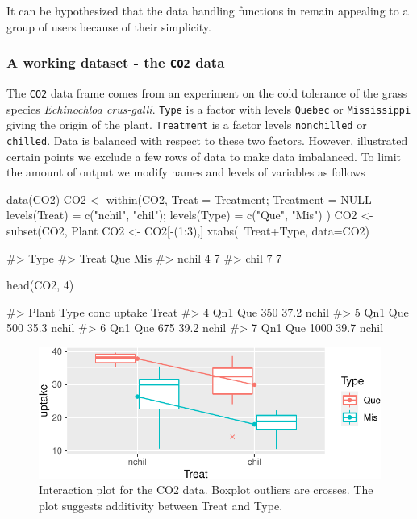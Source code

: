 It can be hypothesized that the data handling functions in 
remain appealing to a group of users because of their simplicity.

\hypertarget{a-working-dataset---the-co2-data}{%
\subsubsection{\texorpdfstring{A working dataset - the \texttt{CO2}
data}{A working dataset - the CO2 data}}\label{a-working-dataset---the-co2-data}}

The \texttt{CO2} data frame comes from an experiment on the cold
tolerance of the grass species \emph{Echinochloa crus-galli}.
\texttt{Type} is a factor with levels \texttt{Quebec} or
\texttt{Mississippi} giving the origin of the plant. \texttt{Treatment}
is a factor levels \texttt{nonchilled} or \texttt{chilled}. Data is
balanced with respect to these two factors. However, illustrated certain
points we exclude a few rows of data to make data imbalanced. To limit
the amount of output we modify names and levels of variables as follows

\begin{Schunk}
\begin{Sinput}
data(CO2)
CO2 <- within(CO2, {
    Treat = Treatment; Treatment = NULL
    levels(Treat) = c("nchil", "chil"); levels(Type) = c("Que", "Mis")
})
CO2 <- subset(CO2, Plant %
CO2 <- CO2[-(1:3),]
xtabs(~Treat+Type, data=CO2)
\end{Sinput}
\begin{Soutput}
#>        Type
#> Treat   Que Mis
#>   nchil   4   7
#>   chil    7   7
\end{Soutput}
\begin{Sinput}
head(CO2, 4)
\end{Sinput}
\begin{Soutput}
#>   Plant Type conc uptake Treat
#> 4   Qn1  Que  350   37.2 nchil
#> 5   Qn1  Que  500   35.3 nchil
#> 6   Qn1  Que  675   39.2 nchil
#> 7   Qn1  Que 1000   39.7 nchil
\end{Soutput}
\end{Schunk}

\begin{Schunk}
\begin{figure}
\includegraphics[keepaspectratio]{doby-hojsgaard-fig-interaction-1} \caption[Interaction plot for the CO2 data]{Interaction plot for the CO2 data. Boxplot outliers are crosses. The plot suggests additivity between Treat and Type.}\label{fig:interaction}
\end{figure}
\end{Schunk}


